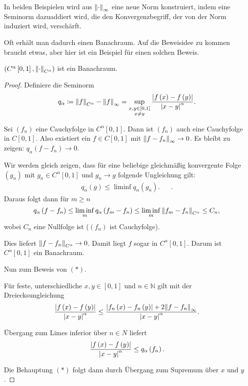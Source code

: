 \documentclass[ngerman, 11pt, a4paper, twoside, abstracton]{scrbook}
\begin{document}
In beiden Beispielen wird aus $\norm{\cdot}_\infty$ eine neue Norm konstruiert, indem eine Seminorm dazuaddiert wird, die den Konvergenzbegriff, der von der Norm induziert wird, verschärft.

Oft erhält man dadurch einen Banachraum. Auf die Beweisidee zu kommen braucht etwas, aber hier ist ein Beispiel für einen solchen Beweis.

\begin{lemma}
  $\left( C^\alpha\left[ 0, 1 \right], \norm{\cdot}_{C^\alpha} \right)$ ist ein Banachraum.
\end{lemma}
\begin{proof}
  Definiere die Seminorm
  \[
    q_\alpha \coloneqq \norm{f}_{C^\alpha} - \norm{f}_\infty = \sup_{\substack{x,y\in\left[ 0, 1 \right] \\ x\ne y}} \frac{\abs{f\left( x \right) - f\left( y \right)}}{\abs{x-y}^\alpha}.
  \]

  Sei $\left( f_n \right)$ eine Cauchyfolge in $C^\alpha\left[ 0, 1 \right]$. Dann ist $\left( f_n \right)$ auch eine Cauchyfolge in $C\left[ 0, 1 \right]$. Also existiert ein $f\in C\left[ 0, 1 \right]$ mit $\norm{f-f_n}_\infty\to 0$. Es bleibt zu zeigen: $q_\alpha\left( f-f_n \right) \to 0$.

  Wir werden gleich zeigen, dass für eine beliebige gleichmäßig konvergente Folge $\left( g_n \right)$ mit $g_n\in C^\alpha \left[ 0, 1 \right]$ und $g_n \to g$ folgende Ungleichung gilt:
  \begin{align*}
    q_\alpha\left( g \right) \le \liminf q_\alpha\left( g_n \right). && \tag{$\ast$}.
  \end{align*}
  Daraus folgt dann für $m \ge n$
  \[
    q_\alpha\left( f - f_n \right) \le \liminf_m q_\alpha\left( f_m - f_n \right) \le \liminf_m \norm{f_m - f_n}_{C^\alpha} \le C_n,
  \]
  wobei $C_n$ eine Nullfolge ist ($\left( f_n \right)$ ist Cauchyfolge).

  Dies liefert $\norm{f - f_n}_{C^\alpha} \to 0$. Damit liegt $f$ sogar in $C^\alpha\left[ 0, 1 \right]$. Darum ist $C^\alpha\left[ 0, 1 \right]$ ein Banachraum.

  Nun zum Beweis von $\left( \ast \right)$.

  Für feste, unterschiedliche $x, y \in \left[ 0, 1 \right]$ und $n\in\mathbb{N}$ gilt mit der Dreiecksungleichung
  \[
    \frac{\abs{f\left( x \right) - f\left( y \right)}}{\abs{x-y}^\alpha} \le \frac{\abs{f_n\left( x \right) - f_n\left( y \right)} + 2 \norm{f - f_n}_\infty}{\abs{x-y}^\alpha}.
  \]

  Übergang zum Limes inferior über $n\in N$ liefert 
  \[
    \frac{\abs{f\left( x \right)-f\left( y \right)}}{\abs{x-y}^\alpha} \le q_\alpha\left( f_n \right).
  \]

  Die Behauptung $\left( \ast \right)$ folgt dann durch Übergang zum Supremum über $x$ und $y$.
\end{proof}
\end{document}
